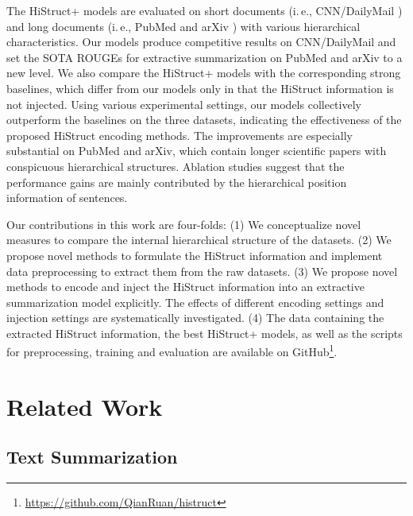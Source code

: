 \documentclass[11pt]{article}
\begin{document}
The HiStruct+ models are evaluated on short documents (i.\,e., CNN/DailyMail \cite{cnndm}) and long documents (i.\,e., PubMed and arXiv \cite{pubmed}) with various hierarchical characteristics. Our models produce competitive results on CNN/DailyMail and set the SOTA ROUGEs for extractive summarization on PubMed and arXiv to a new level.  
We also compare the HiStruct+ models with the corresponding strong baselines, which differ from our models only in that the HiStruct information is not injected. 
Using various experimental settings, our models collectively outperform the baselines on the three datasets, indicating the effectiveness of the proposed HiStruct encoding methods. The improvements are especially substantial on PubMed and arXiv, which contain longer scientific papers with conspicuous hierarchical structures. Ablation studies suggest that the performance gains are mainly contributed by the hierarchical position information of sentences. 



Our contributions in this work are four-folds: 
(1) We conceptualize novel measures to compare the internal hierarchical structure of the datasets. 
(2) We propose novel methods to formulate the HiStruct information and implement data preprocessing to extract them from the raw datasets.
(3) We propose novel methods to encode and inject the HiStruct information into an extractive summarization model explicitly. The effects of different encoding settings and injection settings are systematically investigated. 
(4) The data containing the extracted HiStruct information,  the best HiStruct+ models, as well as the scripts for preprocessing, training and evaluation are available on GitHub\footnote{\url{https://github.com/QianRuan/histruct}}.  


\section{Related Work}
\label{sec:Related Work and background}

\subsection{Text Summarization}
\label{subsec:text_summarization}
\end{document}
